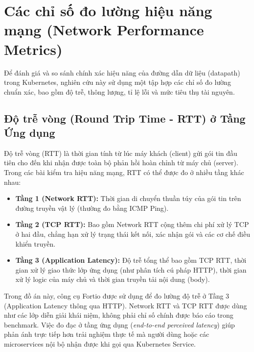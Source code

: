 \section{Các chỉ số đo lường hiệu năng mạng (Network Performance Metrics)}

Để đánh giá và so sánh chính xác hiệu năng của đường dẫn dữ liệu (datapath) trong Kubernetes, nghiên cứu này sử dụng một tập hợp các chỉ số đo lường chuẩn xác, bao gồm độ trễ, thông lượng, tỉ lệ lỗi và mức tiêu thụ tài nguyên.

\subsection{Độ trễ vòng (Round Trip Time - RTT) ở Tầng Ứng dụng}

Độ trễ vòng (RTT) là thời gian tính từ lúc máy khách (client) gửi gói tin đầu tiên cho đến khi nhận được toàn bộ phản hồi hoàn chỉnh từ máy chủ (server). Trong các bài kiểm tra hiệu năng mạng, RTT có thể được đo ở nhiều tầng khác nhau:

\begin{itemize}
    \item \textbf{Tầng 1 (Network RTT):} Thời gian di chuyển thuần túy của gói tin trên đường truyền vật lý (thường đo bằng ICMP Ping).
    \item \textbf{Tầng 2 (TCP RTT):} Bao gồm Network RTT cộng thêm chi phí xử lý TCP ở hai đầu, chẳng hạn xử lý trạng thái kết nối, xác nhận gói và các cơ chế điều khiển truyền.
    \item \textbf{Tầng 3 (Application Latency):} Độ trễ tổng thể bao gồm TCP RTT, thời gian xử lý giao thức lớp ứng dụng (như phân tích cú pháp HTTP), thời gian xử lý logic của máy chủ và thời gian truyền tải nội dung (body).
\end{itemize}

Trong đồ án này, công cụ Fortio được sử dụng để đo lường độ trễ ở Tầng 3 (Application Latency thông qua HTTP). Network RTT và TCP RTT được dùng như các lớp diễn giải khái niệm, không phải chỉ số chính được báo cáo trong benchmark. Việc đo đạc ở tầng ứng dụng (\textit{end-to-end perceived latency}) giúp phản ánh trực tiếp hơn trải nghiệm thực tế mà người dùng hoặc các microservices nội bộ nhận được khi gọi qua Kubernetes Service.

